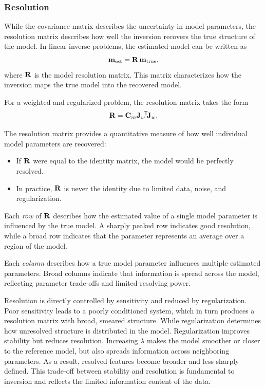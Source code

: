 \subsubsection{Resolution}

While the covariance matrix describes the uncertainty in model parameters, the resolution matrix describes how well the inversion recovers the true structure of the model. In linear inverse problems, the estimated model can be written as
\[
    \vb{m}_{\text{est}} = \vb{R} \, \vb{m}_{\text{true}},
\]
where $\vb{R}$ is the model resolution matrix. This matrix characterizes how the inversion maps the true model into the recovered model.

For a weighted and regularized problem, the resolution matrix takes the form
\[
    \vb{R} = \vb{C}_m \vb{J}_w\!^\mathsf{T}\! \vb{J}_w.
\]

The resolution matrix provides a quantitative measure of how well individual model parameters are recovered:
\begin{itemize}
    \item If $\vb{R}$ were equal to the identity matrix, the model would be perfectly resolved.
    \item In practice, $\vb{R}$ is never the identity due to limited data, noise, and regularization.
\end{itemize}

Each \emph{row} of $\vb{R}$ describes how the estimated value of a single model parameter is influenced by the true model. A sharply peaked row indicates good resolution, while a broad row indicates that the parameter represents an average over a region of the model.

Each \emph{column} describes how a true model parameter influences multiple estimated parameters. Broad columns indicate that information is spread across the model, reflecting parameter trade-offs and limited resolving power.

Resolution is directly controlled by sensitivity and reduced by regularization. Poor sensitivity leads to a poorly conditioned system, which in turn produces a resolution matrix with broad, smeared structure.  While regularization determines how unresolved structure is distributed in the model.  Regularization improves stability but reduces resolution. Increasing $\lambda$ makes the model smoother or closer to the reference model, but also spreads information across neighboring parameters. As a result, resolved features become broader and less sharply defined.
This trade-off between stability and resolution is fundamental to inversion and reflects the limited information content of the data.

